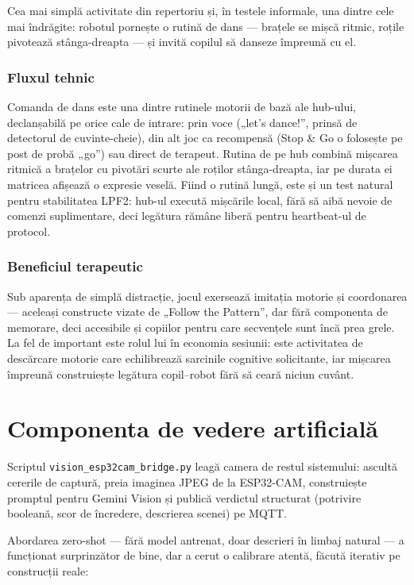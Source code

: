 Cea mai simplă activitate din repertoriu și, în testele informale, una dintre cele mai îndrăgite: robotul pornește o rutină de dans — brațele se mișcă ritmic, roțile pivotează stânga-dreapta — și invită copilul să danseze împreună cu el.

\subsubsection*{Fluxul tehnic}
Comanda de dans este una dintre rutinele motorii de bază ale hub-ului, declanșabilă pe orice cale de intrare: prin voce („let's dance!”, prinsă de detectorul de cuvinte-cheie), din alt joc ca recompensă (Stop \& Go o folosește pe post de probă „go”) sau direct de terapeut. Rutina de pe hub combină mișcarea ritmică a brațelor cu pivotări scurte ale roților stânga-dreapta, iar pe durata ei matricea afișează o expresie veselă. Fiind o rutină lungă, este și un test natural pentru stabilitatea LPF2: hub-ul execută mișcările local, fără să aibă nevoie de comenzi suplimentare, deci legătura rămâne liberă pentru heartbeat-ul de protocol.

\subsubsection*{Beneficiul terapeutic}
Sub aparența de simplă distracție, jocul exersează imitația motorie și coordonarea — aceleași constructe vizate de „Follow the Pattern”, dar fără componenta de memorare, deci accesibile și copiilor pentru care secvențele sunt încă prea grele. La fel de important este rolul lui în economia sesiunii: este activitatea de descărcare motorie care echilibrează sarcinile cognitive solicitante, iar mișcarea împreună construiește legătura copil--robot fără să ceară niciun cuvânt.

\section{Componenta de vedere artificială}
\label{an:sec:viziune}

Scriptul \texttt{vision\_esp32cam\_bridge.py} leagă camera de restul sistemului: ascultă cererile de captură, preia imaginea JPEG de la ESP32-CAM, construiește promptul pentru Gemini Vision și publică verdictul structurat (potrivire booleană, scor de încredere, descrierea scenei) pe MQTT.

Abordarea zero-shot — fără model antrenat, doar descrieri în limbaj natural — a funcționat surprinzător de bine, dar a cerut o calibrare atentă, făcută iterativ pe construcții reale:

